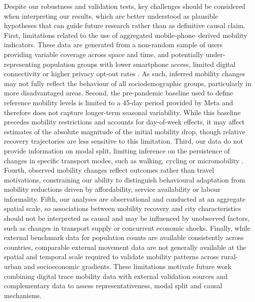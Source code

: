\documentclass[fleqn,10pt]{wlscirep}
\begin{document}
Despite our robustness and validation tests, key challenges should be considered when interpreting our results, which are better understood as plausible hypotheses that can guide future research rather than as definitive causal claim. First, limitations related to the use of aggregated mobile-phone–derived mobility indicators. These data are generated from a non-random sample of users providing variable coverage across space and time, and potentially under-representing population groups with lower smartphone access, limited digital connectivity or higher privacy opt-out rates \cite{cabrera2025bias}. As such, inferred mobility changes may not fully reflect the behaviour of all sociodemographic groups, particularly in more disadvantaged areas. Second, the pre-pandemic baseline used to define reference mobility levels is limited to a 45-day period provided by Meta and therefore does not capture longer-term seasonal variability. While this baseline precedes mobility restrictions and accounts for day-of-week effects, it may affect estimates of the absolute magnitude of the initial mobility drop, though relative recovery trajectories are less sensitive to this limitation. Third, our data do not provide information on modal split, limiting inference on the persistence of changes in specific transport modes, such as walking, cycling or micromobility \cite{zhang2023impacts, KaganCapkin25}. Fourth, observed mobility changes reflect outcomes rather than travel motivations, constraining our ability to distinguish behavioural adaptation from mobility reductions driven by affordability, service availability or labour informality. Fifth, our analyses are observational and conducted at an aggregate spatial scale, so associations between mobility recovery and city characteristics should not be interpreted as causal and may be influenced by unobserved factors, such as changes in transport supply or concurrent economic shocks. Finally, while external benchmark data for population counts are available consistently across countries, comparable external movement data are not generally available at the spatial and temporal scale required to validate mobility patterns across rural-urban and socioeconomic gradients. These limitations motivate future work combining digital trace mobility data with external validation sources and complementary data to assess representativeness, modal split and causal mechanisms.
\end{document}
